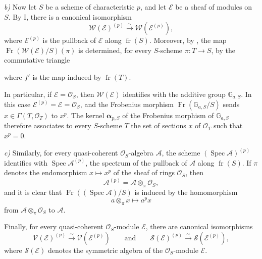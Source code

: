 \smallskip
\noindent\textit{b)}
Now let \(S\) be a scheme of characteristic \(p\), and let
\(\mathcal E\) be a sheaf of modules on \(S\). By I,  there is
a canonical isomorphism
\[
  \mathcal W(\mathcal E)^{(p)}
  \xrightarrow{\sim}
  \mathcal W(\mathcal E^{(p)}),
\]
where \(\mathcal E^{(p)}\) is the pullback of \(\mathcal E\) along
\(\operatorname{fr}(S)\). Moreover, by , the map
\(\operatorname{Fr}(\mathcal W(\mathcal E)/S)(\pi)\) is determined, for
every \(S\)-scheme \(\pi:T\to S\), by the commutative triangle
\begin{center}
  \label{sga3:VIIA:4.1.4-vector-group-frobenius-triangle}
  
\end{center}
where \(f'\) is the map induced by \(\operatorname{fr}(T)\).

In particular, if \(\mathcal E=\mathcal O_S\), then
\(\mathcal W(\mathcal E)\) identifies with the additive group
\(\mathbb G_{a,S}\). In this case
\(\mathcal E^{(p)}=\mathcal E=\mathcal O_S\), and the Frobenius
morphism \(\operatorname{Fr}(\mathbb G_{a,S}/S)\) sends
\(x\in\Gamma(T,\mathcal O_T)\) to \(x^p\). The kernel
\(\boldsymbol\alpha_{p,S}\) of the Frobenius morphism of
\(\mathbb G_{a,S}\) therefore associates to every \(S\)-scheme \(T\) the
set of sections \(x\) of \(\mathcal O_T\) such that \(x^p=0\).

\smallskip
\noindent\textit{c)}
Similarly, for every quasi-coherent \(\mathcal O_S\)-algebra
\(\mathcal A\), the scheme
\((\operatorname{Spec}\mathcal A)^{(p)}\) identifies with
\(\operatorname{Spec}\mathcal A^{(p)}\), the spectrum of the
pullback of \(\mathcal A\) along \(\operatorname{fr}(S)\). If
\(\pi\) denotes the endomorphism \(x\mapsto x^p\) of the sheaf of
rings \(\mathcal O_S\), then
\[
  \mathcal A^{(p)}
  =
  \mathcal A\otimes_\pi\mathcal O_S,
\]
and it is clear that \(\operatorname{Fr}((\operatorname{Spec}\mathcal A)/S)\)
is induced by the homomorphism
\[
  a\otimes_\pi x\longmapsto a^p x
\]
from \(\mathcal A\otimes_\pi\mathcal O_S\) to \(\mathcal A\).

Finally, for every quasi-coherent \(\mathcal O_S\)-module
\(\mathcal E\), there are canonical isomorphisms
\[
  \mathcal V(\mathcal E)^{(p)}
  \xrightarrow{\sim}
  \mathcal V(\mathcal E^{(p)})
  \qquad\text{and}\qquad
  \mathcal S(\mathcal E)^{(p)}
  \xrightarrow{\sim}
  \mathcal S(\mathcal E^{(p)}),
\]
where \(\mathcal S(\mathcal E)\) denotes the symmetric algebra of
the \(\mathcal O_S\)-module \(\mathcal E\).

